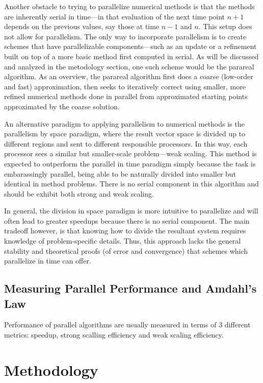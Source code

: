 \documentclass[letterpaper,12pt]{article}
\begin{document}
Another obstacle to trying to parallelize numerical methods is that the methods
are inherently serial in time---in that evaluation of the next time point $n+1$
depends on the previous values, say those at time $n-1$ and $n$. This setup
does not allow for parallelism. The only way to incorporate parallelism is to
create schemes that have parallelizable components---such as an update or a
refinement built on top of a more basic method first computed in serial. As will be discussed and analyzed in the
metodology section, one such scheme would be the parareal algorithm. As an
overview, the parareal algorithm first does a coarse (low-order and fast)
approximation, then seeks to iteratively correct using smaller, more refined
numerical methods done in parallel from approximated starting points
approximated by the coarse solution.

An alternative paradigm to applying parallelism to numerical methods is the
parallelism by space paradigm, where the result vector space is divided up to
different regions and sent to different responsible processors. In this way,
each processor sees a similar but smaller-scale problem---weak scaling. This
method is expected to outperform the parallel in time paradigm simply because
the task is embarassingly parallel, being able to be naturally divided
into smaller but identical in method problems. There is no serial component in
this algorithm and should be exhibit both strong and weak scaling.

In general, the division in space paradigm is more intuitive to parallelize and
will often lead to greater speedups because there is no serial component. The main tradeoff however, is that knowing how to divide the resultant system requires knowledge of problem-specific details. Thus, this approach lacks the
general stability and theoretical proofs (of error and convergence) that schemes which parallelize in
time can offer.

\subsection{Measuring Parallel Performance and Amdahl's Law}

Performance of parallel algorithms are usually measured in terms of 3 different metrics: speedup, strong scalling efficiency and weak scaling efficiency. 

\section{Methodology}
\end{document}
